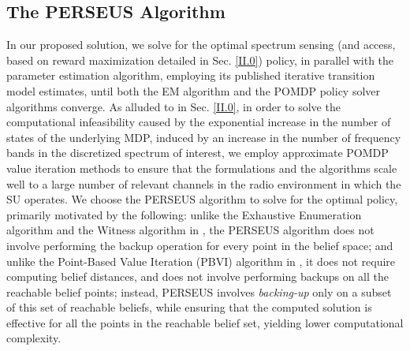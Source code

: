 \documentclass[12pt, draftcls, onecolumn]{IEEEtran}
\begin{document}
\subsection{The PERSEUS Algorithm}\label{II.II}
In our proposed solution, we solve for the optimal spectrum sensing (and access, based on reward maximization detailed in Sec. \ref{II.0}) policy, in parallel with the parameter estimation algorithm, employing its published iterative transition model estimates, until both the EM algorithm and the POMDP policy solver algorithms converge. As alluded to in Sec. \ref{II.0}, in order to solve the computational infeasibility caused by the exponential increase in the number of states of the underlying MDP, induced by an increase in the number of frequency bands in the discretized spectrum of interest, we employ approximate POMDP value iteration methods to ensure that the formulations and the algorithms scale well to a large number of relevant channels in the radio environment in which the SU operates. We choose the PERSEUS algorithm \cite{WCL:13} to solve for the optimal policy, primarily motivated by the following: unlike the Exhaustive Enumeration algorithm and the Witness algorithm in \cite{PUOccupancy:18}, the PERSEUS algorithm does not involve performing the backup operation for every point in the belief space; and unlike the Point-Based Value Iteration (PBVI) algorithm in \cite{PUOccupancy:17}, it does not require computing belief distances, and does not involve performing backups on all the reachable belief points; instead, PERSEUS involves \emph{backing-up} only on a subset of this set of reachable beliefs, while ensuring that the computed solution is effective for all the points in the reachable belief set, yielding lower computational complexity.
\end{document}
